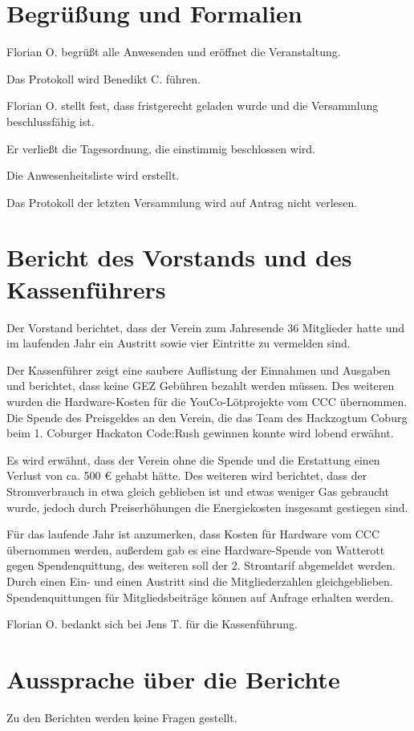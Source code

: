 \section{Begrüßung und Formalien}
Florian O. begrüßt alle Anwesenden und eröffnet die Veranstaltung. 

Das Protokoll wird Benedikt C. führen.

Florian O. stellt fest, dass fristgerecht geladen wurde und die Versammlung beschlussfähig ist. 

Er verließt die Tagesordnung, die einstimmig beschlossen wird.

Die Anwesenheitsliste wird erstellt.

Das Protokoll der letzten Versammlung wird auf Antrag nicht verlesen. 


\section{Bericht des Vorstands und des Kassenführers}
Der Vorstand berichtet, dass der Verein zum Jahresende 36 Mitglieder hatte und im laufenden Jahr ein Austritt sowie vier Eintritte zu vermelden sind.

Der Kassenführer zeigt eine saubere Auflistung der Einnahmen und Ausgaben und berichtet, dass keine GEZ Gebühren bezahlt werden müssen.
Des weiteren wurden die Hardware-Kosten für die YouCo-Lötprojekte vom CCC übernommen.
Die Spende des Preisgeldes an den Verein, die das Team des Hackzogtum Coburg beim 1. Coburger Hackaton Code:Rush gewinnen konnte wird lobend erwähnt.

Es wird erwähnt, dass der Verein ohne die Spende und die Erstattung einen Verlust von ca. 500 € gehabt hätte.
Des weiteren wird berichtet, dass der Stromverbrauch in etwa gleich geblieben ist und etwas weniger Gas gebraucht wurde, jedoch durch Preiserhöhungen die Energiekosten insgesamt gestiegen sind.

Für das laufende Jahr ist anzumerken, dass Kosten für Hardware vom CCC übernommen werden, außerdem gab es eine Hardware-Spende von Watterott gegen Spendenquittung, des weiteren soll der 2. Stromtarif abgemeldet werden. Durch einen Ein- und einen Austritt sind die Mitgliederzahlen gleichgeblieben. Spendenquittungen für Mitgliedsbeiträge können auf Anfrage erhalten werden.

Florian O. bedankt sich bei Jens T. für die Kassenführung.



\section{Aussprache über die Berichte}
Zu den Berichten werden keine Fragen gestellt.

